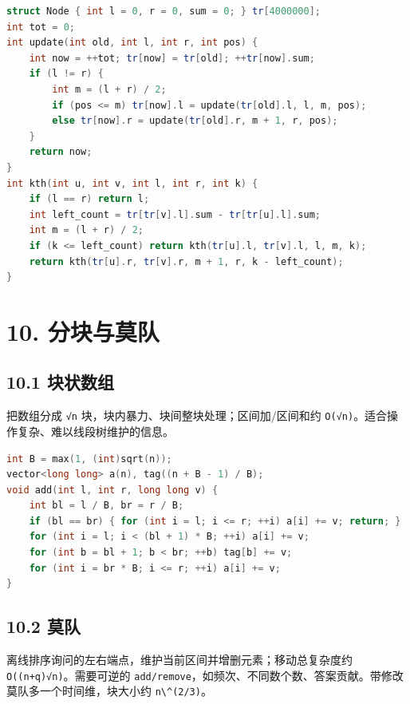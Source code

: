 \begin{lstlisting}[language={C++}]
struct Node { int l = 0, r = 0, sum = 0; } tr[4000000];
int tot = 0;
int update(int old, int l, int r, int pos) {
    int now = ++tot; tr[now] = tr[old]; ++tr[now].sum;
    if (l != r) {
        int m = (l + r) / 2;
        if (pos <= m) tr[now].l = update(tr[old].l, l, m, pos);
        else tr[now].r = update(tr[old].r, m + 1, r, pos);
    }
    return now;
}
int kth(int u, int v, int l, int r, int k) {
    if (l == r) return l;
    int left_count = tr[tr[v].l].sum - tr[tr[u].l].sum;
    int m = (l + r) / 2;
    if (k <= left_count) return kth(tr[u].l, tr[v].l, l, m, k);
    return kth(tr[u].r, tr[v].r, m + 1, r, k - left_count);
}
\end{lstlisting}

\section{10. 分块与莫队}\label{ux5206ux5757ux4e0eux83abux961f}

\subsection{10.1 块状数组}\label{ux5757ux72b6ux6570ux7ec4}

把数组分成 \passthrough{\lstinline!√n!} 块，块内暴力、块间整块处理；区间加/区间和约 \passthrough{\lstinline!O(√n)!}。适合操作复杂、难以线段树维护的信息。

\begin{lstlisting}[language={C++}]
int B = max(1, (int)sqrt(n));
vector<long long> a(n), tag((n + B - 1) / B);
void add(int l, int r, long long v) {
    int bl = l / B, br = r / B;
    if (bl == br) { for (int i = l; i <= r; ++i) a[i] += v; return; }
    for (int i = l; i < (bl + 1) * B; ++i) a[i] += v;
    for (int b = bl + 1; b < br; ++b) tag[b] += v;
    for (int i = br * B; i <= r; ++i) a[i] += v;
}
\end{lstlisting}

\subsection{10.2 莫队}\label{ux83abux961f}

离线排序询问的左右端点，维护当前区间并增删元素；移动总复杂度约 \passthrough{\lstinline!O((n+q)√n)!}。需要可逆的 \passthrough{\lstinline!add/remove!}，如频次、不同数个数、答案贡献。带修改莫队多一个时间维，块大小约 \passthrough{\lstinline!n\^(2/3)!}。

